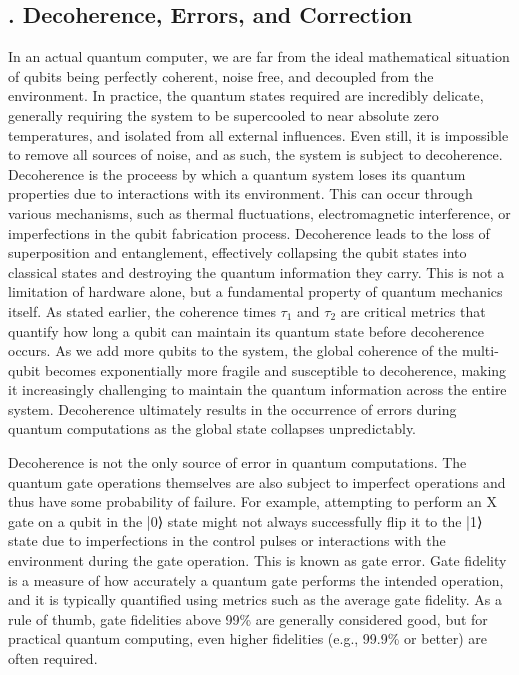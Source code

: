 \documentclass{elbioimp2}
\begin{document}
\subsection{. Decoherence, Errors, and Correction}
In an actual quantum computer, we are far from the ideal mathematical situation of qubits being perfectly coherent, noise free, and decoupled from the environment. In practice, the quantum states required are incredibly delicate, generally requiring the system to be supercooled to near absolute zero temperatures, and isolated from all external influences. Even still, it is impossible to remove all sources of noise, and as such, the system is subject to decoherence. Decoherence is the proceess by which a quantum system loses its quantum properties due to interactions with its environment. This can occur through various mechanisms, such as thermal fluctuations, electromagnetic interference, or imperfections in the qubit fabrication process. Decoherence leads to the loss of superposition and entanglement, effectively collapsing the qubit states into classical states and destroying the quantum information they carry. This is not a limitation of hardware alone, but a fundamental property of quantum mechanics itself. As stated earlier, the coherence times $\tau_1$ and $\tau_2$ are critical metrics that quantify how long a qubit can maintain its quantum state before decoherence occurs. As we add more qubits to the system, the global coherence of the multi-qubit becomes exponentially more fragile and susceptible to decoherence, making it increasingly challenging to maintain the quantum information across the entire system. Decoherence ultimately results in the occurrence of errors during quantum computations as the global state collapses unpredictably.

Decoherence is not the only source of error in quantum computations. The quantum gate operations themselves are also subject to imperfect operations and thus have some probability of failure. For example, attempting to perform an X gate on a qubit in the |0⟩ state might not always successfully flip it to the |1⟩ state due to imperfections in the control pulses or interactions with the environment during the gate operation. This is known as gate error. Gate fidelity is a measure of how accurately a quantum gate performs the intended operation, and it is typically quantified using metrics such as the average gate fidelity. As a rule of thumb, gate fidelities above 99\% are generally considered good, but for practical quantum computing, even higher fidelities (e.g., 99.9\% or better) are often required\cite{99.9percent-required-fidelity}.
\end{document}

